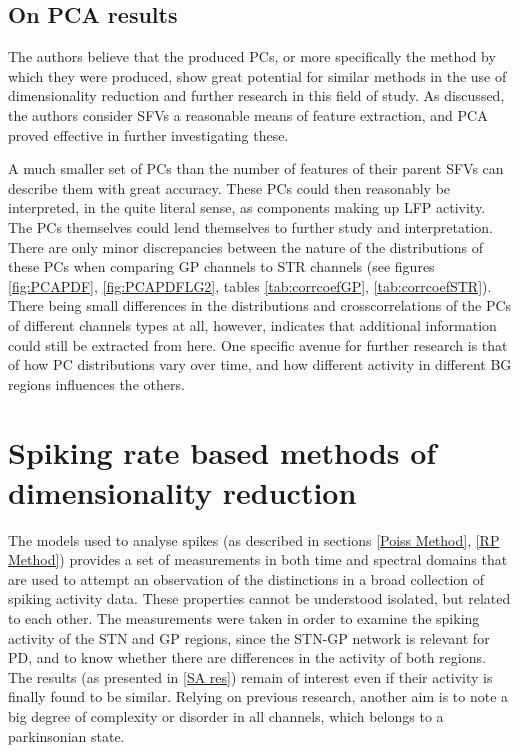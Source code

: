 \documentclass{kththesis}
\begin{document}
\subsection{On PCA results}

The authors believe that the produced PCs, or more specifically the method by which they were produced, show great potential for similar methods in the use of dimensionality reduction and further research in this field of study.
As discussed, the authors consider SFVs a reasonable means of feature extraction, and PCA proved effective in further investigating these.

A much smaller set of PCs than the number of features of their parent SFVs can describe them with great accuracy.
These PCs could then reasonably be interpreted, in the quite literal sense, as components making up LFP activity.
The PCs themselves could lend themselves to further study and interpretation.
There are only minor discrepancies between the nature of the distributions of these PCs when comparing GP channels to STR channels (see figures \ref{fig:PCAPDF}, \ref{fig:PCAPDFLG2}, tables \ref{tab:corrcoefGP}, \ref{tab:corrcoefSTR}).
There being small differences in the distributions and crosscorrelations of the PCs of different channels types at all, however, indicates that additional information could still be extracted from here.
One specific avenue for further research is that of how PC distributions vary over time, and how different activity in different BG regions influences the others.

\section{Spiking rate based methods of dimensionality reduction}

The models used to analyse spikes (as described in sections \ref{Poiss Method}, \ref{RP Method}) provides a set of measurements in both time and spectral domains that are used to attempt an observation of the distinctions in a broad collection of spiking activity data. 
These properties cannot be understood isolated, but related to each other. 
The measurements were taken in order to examine the spiking activity of the STN and GP regions, since the STN-GP network is relevant for PD, and to know whether there are differences in the activity of both regions. 
The results (as presented in \ref{SA res}) remain of interest even if their activity is finally found to be similar. 
Relying on previous research, another aim is to note a big degree of complexity or disorder in all channels, which belongs to a parkinsonian state.
\end{document}
